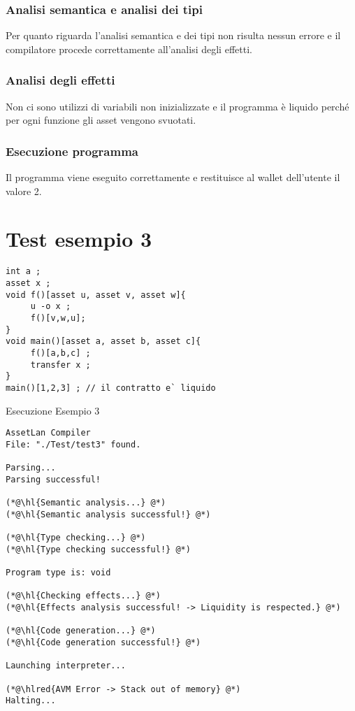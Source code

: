 \documentclass[12pt,twoside,openright,a4paper]{report}
\DeclareRobustCommand{\hlred}[1]{{\sethlcolor{red}\hl{#1}}}
\begin{document}
\subsubsection{Analisi semantica e analisi dei tipi}
Per quanto riguarda l'analisi semantica e dei tipi non risulta nessun errore e il compilatore procede correttamente all'analisi degli effetti.

\subsubsection{Analisi degli effetti}
Non ci sono utilizzi di variabili non inizializzate e il programma è liquido perché per ogni funzione gli asset vengono svuotati.

\subsubsection{Esecuzione programma}
Il programma viene eseguito correttamente e restituisce al wallet dell'utente il valore 2.



\section{Test esempio 3}
\begin{lstlisting}
int a ;
asset x ;
void f()[asset u, asset v, asset w]{
     u -o x ;
     f()[v,w,u];
}
void main()[asset a, asset b, asset c]{
     f()[a,b,c] ;
     transfer x ;
}
main()[1,2,3] ;	// il contratto e` liquido
\end{lstlisting}

Esecuzione Esempio 3
\begin{lstlisting}
AssetLan Compiler
File: "./Test/test3" found.

Parsing...
Parsing successful!

(*@\hl{Semantic analysis...} @*)
(*@\hl{Semantic analysis successful!} @*)

(*@\hl{Type checking...} @*)
(*@\hl{Type checking successful!} @*)

Program type is: void

(*@\hl{Checking effects...} @*)
(*@\hl{Effects analysis successful! -> Liquidity is respected.} @*)

(*@\hl{Code generation...} @*)
(*@\hl{Code generation successful!} @*)

Launching interpreter...

(*@\hlred{AVM Error -> Stack out of memory} @*)
Halting...
\end{lstlisting}
\end{document}
